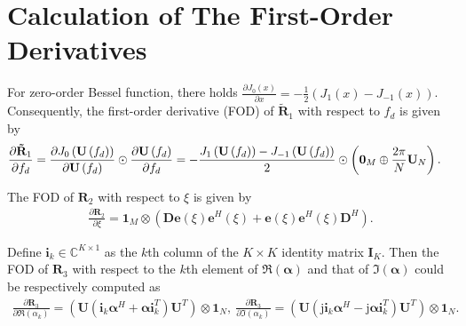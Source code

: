 \documentclass[12pt, draftclsnofoot, onecolumn]{IEEEtran}
\begin{document}
\section{Calculation of The First-Order Derivatives}{\label{Derivative}}
For zero-order Bessel function, there holds $\frac{\partial {{J}_{0}}\left( x \right)}{\partial x} =-\frac{1}{2}\left( {{J}_{1}}\left( x \right)-{{J}_{-1}}\left( x \right) \right)$.
Consequently, the first-order derivative (FOD) of ${{\mathbf{\tilde{R}}}_{1}}$ with respect to ${{f}_{d}}$ is given by
\begin{align}
 & \frac{\partial {{{\mathbf{\tilde{R}}}}_{1}}}{\partial {{f}_{d}}} =\frac{\partial {{J}_{0}}\left( \mathbf{U}\left( {{f}_{d}} \right) \right)}{\partial \mathbf{U}\left( {{f}_{d}} \right)}\odot \frac{\partial \mathbf{U}\left( {{f}_{d}} \right)}{\partial {{f}_{d}}} = -\frac{{{J}_{1}}\left( \mathbf{U}\left( {{f}_{d}} \right) \right)-{{J}_{-1}}\left( \mathbf{U}\left( {{f}_{d}} \right) \right)}{2} \odot \left( {{\mathbf{0}}_{M}}\oplus \frac{2{\rm\pi}}{N}{{\mathbf{U}}_{N}}  \right).
\end{align}

The FOD of ${{\mathbf{R}}_{2}}$ with respect to $\xi $ is given by
\begin{align}
 \frac{\partial {{\mathbf{R}}_{2}}}{\partial \xi } ={{\mathbf{1}}_{M}}\otimes \left( \mathbf{De}\left( \xi  \right){{\mathbf{e}}^{H}}\left( \xi  \right)+\mathbf{e}\left( \xi  \right){{\mathbf{e}}^{H}}\left( \xi  \right){{\mathbf{D}}^{H}} \right).
\end{align}

Define ${{\mathbf{i}}_{k}}\in {{\mathbb{C}}^{K\times 1}}$ as the $k$th column of the $K \times K$ identity matrix ${{\mathbf{I}}_{K}}$. Then the FOD of ${{\mathbf{R}}_{3}}$ with respect to the $k$th element of $\Re \left( \boldsymbol{\alpha } \right)$ and that of $\Im \left( \boldsymbol{\alpha } \right)$ could be respectively computed as
\begin{align}
\frac{\partial {{\mathbf{R}}_{3}}}{\partial \Re \left( {{\alpha }_{k}} \right)} =\left( \mathbf{U}\left( {{\mathbf{i}}_{k}}{{\boldsymbol{\alpha }}^{H}}+{\boldsymbol{\alpha}}\mathbf{ i}_{k}^{T} \right){{\mathbf{U}}^{T}} \right)\otimes {{\mathbf{1}}_{N}}, \ \frac{\partial {{\mathbf{R}}_{3}}}{\partial \Im \left( {{\alpha }_{k}} \right)} =\left( \mathbf{U}\left( \text{j}{{\mathbf{i}}_{k}}{{\boldsymbol{\alpha }}^{H}}-\text{j}{\boldsymbol{\alpha}}\mathbf{ i}_{k}^{T} \right){{\mathbf{U}}^{T}} \right)\otimes {{\mathbf{1}}_{N}}.
\end{align}
\end{document}
